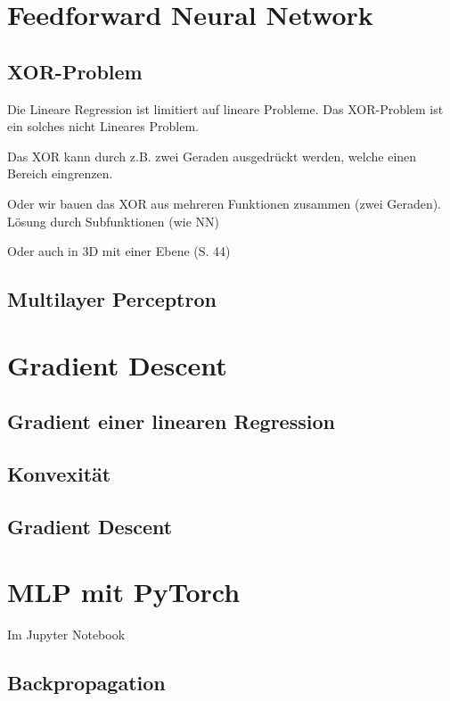 \documentclass[a4paper]{article}
\begin{document}
\section{Feedforward Neural Network}

\subsection{XOR-Problem}

Die Lineare Regression ist limitiert auf lineare Probleme. Das XOR-Problem ist ein solches nicht Lineares Problem.

Das XOR kann durch z.B. zwei Geraden ausgedrückt werden, welche einen Bereich eingrenzen.

Oder wir bauen das XOR aus mehreren Funktionen zusammen (zwei Geraden). Lösung durch Subfunktionen (wie NN)

Oder auch in 3D mit einer Ebene (S. 44)

\subsection{Multilayer Perceptron}


\section{Gradient Descent}

\subsection{Gradient einer linearen Regression}

\subsection{Konvexität}

\subsection{Gradient Descent}

\section{MLP mit PyTorch}

Im Jupyter Notebook


\subsection{Backpropagation}
\end{document}
